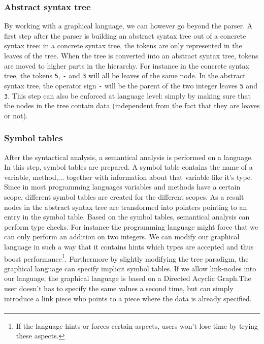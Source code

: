 \subsubsection{Abstract syntax tree}
By working with a graphical language, we can however go beyond the parser. A
first step after the parser is building an abstract syntax tree out of a
concrete syntax tree: in a concrete syntax tree, the tokens are only
represented in the leaves of the tree. When the tree is converted into an
abstract syntax tree, tokens are moved to higher parts in the hierarchy. For
instance in the concrete syntax tree, the tokens \verb+5+, \verb+-+ and
\verb+3+ will all be leaves of the same node. In the abstract syntax tree, the
operator sign \verb+-+ will be the parent of the two integer leaves \verb+5+
and \verb+3+. This step can also be enforced at language level: simply by
making sure that the nodes in the tree contain data (independent from the fact
that they are leaves or not).
\subsubsection{Symbol tables}
After the syntactical analysis, a semantical analysis is performed on a
language. In this step, symbol tables are prepared. A symbol table contains the
name of a variable, method,... together with information about that variable
like it's type. Since in most programming languages variables and methods have
a certain scope, different symbol tables are created for the different scopes.
As a result nodes in the abstract syntax tree are transformed into pointers
pointing to an entry in the symbol table. Based on the symbol tables,
semantical analysis can perform type checks. For instance the programming
language might force that we can only perform an addition on two integers. We
can modify our graphical language in such a way that it contains hints which
types are accepted and thus boost performance\footnote{If the language hints
or forces certain aspects, users won't lose time by trying these aspects.}.
Furthermore by slightly modifying the tree paradigm, the graphical language can
specify implicit symbol tables. If we allow link-nodes into our language, the
graphical language is based on a Directed Acyclic Graph.The user doesn't has to
specify the same values a second time, but can simply introduce a link piece
who points to a piece where the data is already specified.
\paragraph{}
